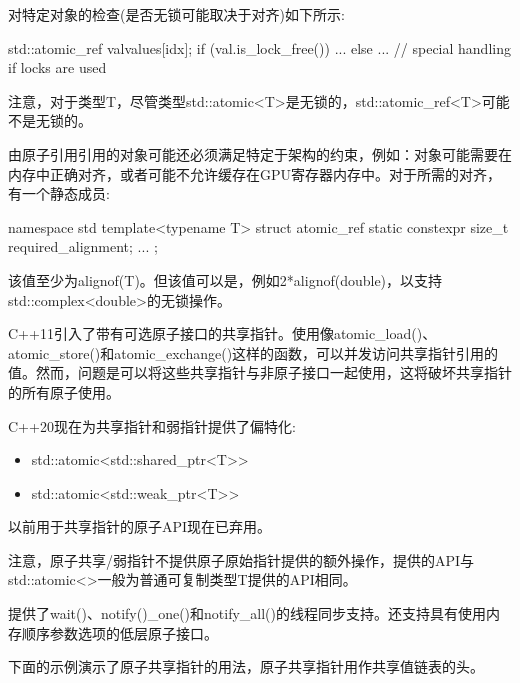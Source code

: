 对特定对象的检查(是否无锁可能取决于对齐)如下所示:

\begin{cpp}
std::atomic_ref val{values[idx]};
if (val.is_lock_free()) {
	...
}
else {
	... // special handling if locks are used
}
\end{cpp}

注意，对于类型T，尽管类型std::atomic<T>是无锁的，std::atomic\_ref<T>可能不是无锁的。

由原子引用引用的对象可能还必须满足特定于架构的约束，例如：对象可能需要在内存中正确对齐，或者可能不允许缓存在GPU寄存器内存中。对于所需的对齐，有一个静态成员:

\begin{cpp}
namespace std {
	template<typename T> struct atomic_ref {
		static constexpr size_t required_alignment;
		...
	};
}
\end{cpp}

该值至少为alignof(T)。但该值可以是，例如2*alignof(double)，以支持std::complex<double>的无锁操作。


C++11引入了带有可选原子接口的共享指针。使用像atomic\_load()、atomic\_store()和atomic\_exchange()这样的函数，可以并发访问共享指针引用的值。然而，问题是可以将这些共享指针与非原子接口一起使用，这将破坏共享指针的所有原子使用。

C++20现在为共享指针和弱指针提供了偏特化:

\begin{itemize}
\item 
std::atomic<std::shared\_ptr<T>{}>

\item 
std::atomic<std::weak\_ptr<T>{}>
\end{itemize}

以前用于共享指针的原子API现在已弃用。

注意，原子共享/弱指针不提供原子原始指针提供的额外操作，提供的API与std::atomic<>一般为普通可复制类型T提供的API相同。

提供了wait()、notify()\_one()和notify\_all()的线程同步支持。还支持具有使用内存顺序参数选项的低层原子接口。


下面的示例演示了原子共享指针的用法，原子共享指针用作共享值链表的头。


